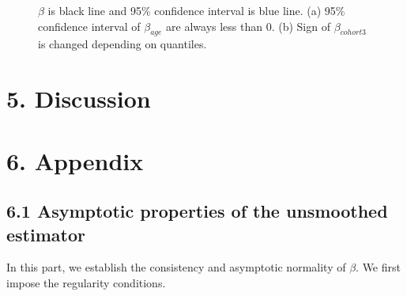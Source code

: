 \documentclass[12pt]{article}
\begin{document}
	\begin{figure}[htp]
		\centering
		\caption{
			$\beta$ is black line and 95\% confidence interval is blue line.
			(a) 95\% confidence interval of $\beta_{age}$ are always less than 0. 
			(b) Sign of $\beta_{cohort3}$ is changed depending on quantiles. 
			}
	\end{figure}

\section{5. Discussion}
	
\section{6. Appendix}
\subsection{6.1 Asymptotic properties of the unsmoothed estimator}
	\noindent In this part, we establish the consistency and asymptotic normality of $\beta$. We first impose the regularity conditions.
	
\end{document}
